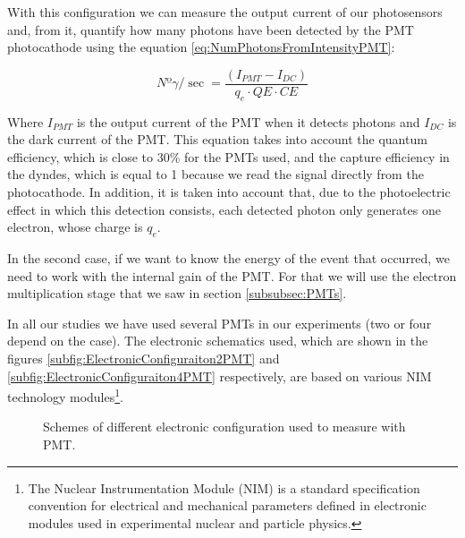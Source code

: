 With this configuration we can measure the output current of our photosensors and, from it, quantify how many photons have been detected by the PMT photocathode using the equation \ref{eq:NumPhotonsFromIntensityPMT}:

\begin{equation}
Nº\gamma/\sec = \frac{\left( I_{PMT} - I_{DC} \right)}{q_e \cdot{} QE \cdot{} CE}
\label{eq:NumPhotonsFromIntensityPMT}
\end{equation}

Where $I_{PMT}$ is the output current of the PMT when it detects photons and $I_{DC}$ is the dark current of the PMT. This equation takes into account the quantum efficiency, which is close to $30\%$ for the PMTs used, and the capture efficiency in the dyndes, which is equal to 1 because we read the signal directly from the photocathode. In addition, it is taken into account that, due to the photoelectric effect in which this detection consists, each detected photon only generates one electron, whose charge is $q_e$.

In the second case, if we want to know the energy of the event that occurred, we need to work with the internal gain of the PMT. For that we will use the electron multiplication stage that we saw in section \ref{subsubsec:PMTs}.

In all our studies we have used several PMTs in our experiments (two or four depend on the case). The electronic schematics used, which are shown in the figures \ref{subfig:ElectronicConfiguraiton2PMT} and \ref{subfig:ElectronicConfiguraiton4PMT} respectively, are based on various NIM technology modules\footnote{The Nuclear Instrumentation Module (NIM) is a standard specification convention for electrical and mechanical parameters defined in electronic modules used in experimental nuclear and particle physics.}.

\begin{figure}[h]
 \centering
    \newline
 \caption{Schemes of different electronic configuration used to measure with PMT.}
 \label{fig:ElectronicConfiguraitonsPMT}
\end{figure}

